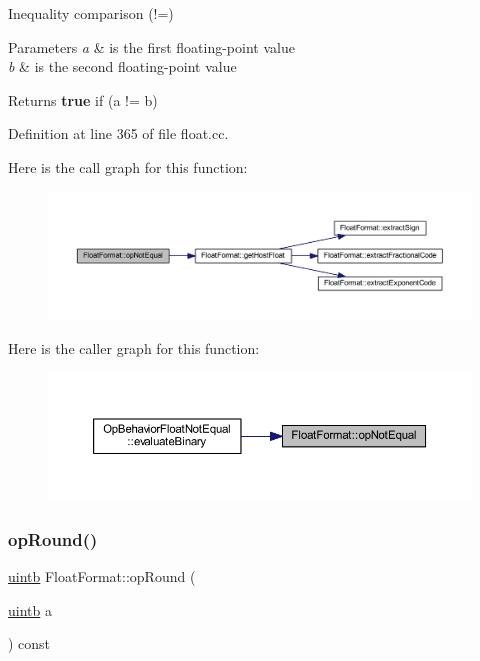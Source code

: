 Inequality comparison (!=) 


\begin{DoxyParams}{Parameters}
{\em a} & is the first floating-\/point value \\
\hline
{\em b} & is the second floating-\/point value \\
\hline
\end{DoxyParams}
\begin{DoxyReturn}{Returns}
{\bfseries{true}} if (a != b) 
\end{DoxyReturn}


Definition at line 365 of file float.\+cc.

Here is the call graph for this function\+:
\nopagebreak
\begin{figure}[H]
\begin{center}
\leavevmode
\includegraphics[width=350pt]{class_float_format_a1f28cec1861ddf0f416033f971a43b16_cgraph}
\end{center}
\end{figure}
Here is the caller graph for this function\+:
\nopagebreak
\begin{figure}[H]
\begin{center}
\leavevmode
\includegraphics[width=350pt]{class_float_format_a1f28cec1861ddf0f416033f971a43b16_icgraph}
\end{center}
\end{figure}
\mbox{\label{class_float_format_adde6362a78f0ad6cd66fdd04c71032cf}} 
\subsubsection{\texorpdfstring{opRound()}{opRound()}}
{\footnotesize\ttfamily \mbox{\hyperlink{types_8h_a2db313c5d32a12b01d26ac9b3bca178f}{uintb}} Float\+Format\+::op\+Round (\begin{DoxyParamCaption}\item[{\mbox{\hyperlink{types_8h_a2db313c5d32a12b01d26ac9b3bca178f}{uintb}}}]{a }\end{DoxyParamCaption}) const}



